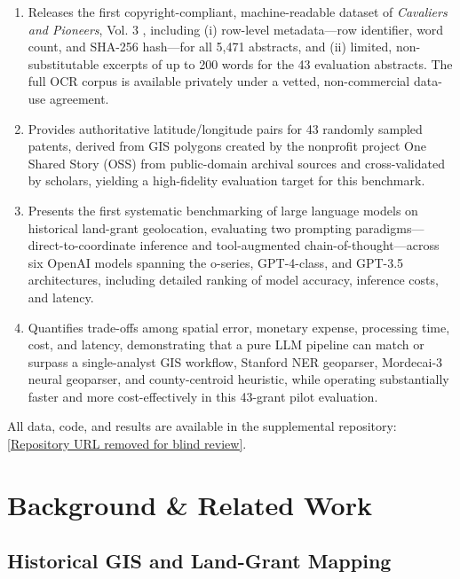 \begin{enumerate}
\def\labelenumi{\arabic{enumi}.}
\tightlist
\item
  Releases the first copyright-compliant, machine-readable dataset of
  \emph{Cavaliers and Pioneers}, Vol. 3 \citep{Nugent1979_cavaliers3},
  including (i) row-level metadata---row identifier, word count, and
  SHA-256 hash---for all 5,471 abstracts, and (ii) limited,
  non-substitutable excerpts of up to 200 words for the 43 evaluation
  abstracts. The full OCR corpus is available privately under a vetted,
  non-commercial data-use agreement.
\item
  Provides authoritative latitude/longitude pairs for 43 randomly
  sampled patents, derived from GIS polygons created by the nonprofit
  project One Shared Story (OSS) from public-domain archival sources and
  cross-validated by scholars, yielding a high-fidelity evaluation
  target for this benchmark.
\item
  Presents the first systematic benchmarking of large language models on
  historical land-grant geolocation, evaluating two prompting
  paradigms---direct-to-coordinate inference and tool-augmented
  chain-of-thought---across six OpenAI models spanning the o-series,
  GPT-4-class, and GPT-3.5 architectures, including detailed ranking of
  model accuracy, inference costs, and latency.
\item
  Quantifies trade-offs among spatial error, monetary expense,
  processing time, cost, and latency, demonstrating that a pure LLM
  pipeline can match or surpass a single-analyst GIS workflow, Stanford
  NER geoparser, Mordecai-3 neural geoparser, and county-centroid
  heuristic, while operating substantially faster and more
  cost-effectively in this 43-grant pilot evaluation.
\end{enumerate}

All data, code, and results are available in the supplemental
repository:
\url{[Repository URL removed for blind review]}.

\section{Background \& Related Work}\label{background-related-work}

\subsection{Historical GIS and Land-Grant
Mapping}\label{historical-gis-and-land-grant-mapping}

